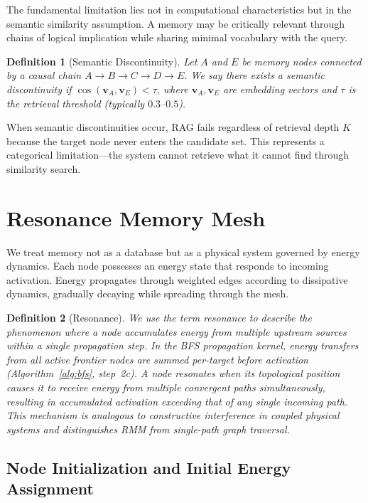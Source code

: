 \documentclass[11pt]{article}
\newtheorem{definition}{Definition}
\begin{document}
The fundamental limitation lies not in computational characteristics but
in the semantic similarity assumption. A memory may be critically
relevant through chains of logical implication while sharing minimal
vocabulary with the query.

\begin{definition}[Semantic Discontinuity]
Let $A$ and $E$ be memory nodes connected by a causal chain
$A \to B \to C \to D \to E$. We say there exists a
\emph{semantic discontinuity} if
$\cos(\mathbf{v}_A, \mathbf{v}_E) < \tau$,
where $\mathbf{v}_A, \mathbf{v}_E$ are embedding vectors and $\tau$ is
the retrieval threshold (typically $0.3$--$0.5$).
\end{definition}

When semantic discontinuities occur, RAG fails regardless of retrieval
depth $K$ because the target node never enters the candidate set. This
represents a categorical limitation---the system cannot retrieve what it
cannot find through similarity search.

\section{Resonance Memory Mesh}

We treat memory not as a database but as a physical system governed by
energy dynamics. Each node possesses an energy state that responds to
incoming activation. Energy propagates through weighted edges according
to dissipative dynamics, gradually decaying while spreading through the
mesh.

\begin{definition}[Resonance]
We use the term \emph{resonance} to describe the phenomenon where a node
accumulates energy from multiple upstream sources within a single
propagation step. In the BFS propagation kernel, energy transfers from
all active frontier nodes are summed per-target before activation
(Algorithm~\ref{alg:bfs}, step~2c). A node \emph{resonates} when its
topological position causes it to receive energy from multiple
convergent paths simultaneously, resulting in accumulated activation
exceeding that of any single incoming path. This mechanism is analogous
to constructive interference in coupled physical systems and
distinguishes RMM from single-path graph traversal.
\end{definition}

\subsection{Node Initialization and Initial Energy Assignment}
\end{document}
